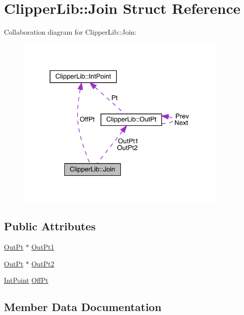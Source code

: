 \hypertarget{struct_clipper_lib_1_1_join}{}\section{Clipper\+Lib\+::Join Struct Reference}
\label{struct_clipper_lib_1_1_join}


Collaboration diagram for Clipper\+Lib\+::Join\+:
\nopagebreak
\begin{figure}[H]
\begin{center}
\leavevmode
\includegraphics[width=291pt]{struct_clipper_lib_1_1_join__coll__graph}
\end{center}
\end{figure}
\subsection*{Public Attributes}
\begin{DoxyCompactItemize}
\item 
\mbox{\hyperlink{struct_clipper_lib_1_1_out_pt}{Out\+Pt}} $\ast$ \mbox{\hyperlink{struct_clipper_lib_1_1_join_a83d7ff096b1cf9425f1c814b7ee5a55d}{Out\+Pt1}}
\item 
\mbox{\hyperlink{struct_clipper_lib_1_1_out_pt}{Out\+Pt}} $\ast$ \mbox{\hyperlink{struct_clipper_lib_1_1_join_a589b2e1162679def2ccd3889306a9230}{Out\+Pt2}}
\item 
\mbox{\hyperlink{struct_clipper_lib_1_1_int_point}{Int\+Point}} \mbox{\hyperlink{struct_clipper_lib_1_1_join_afa70561700d774cd762d125f9866327f}{Off\+Pt}}
\end{DoxyCompactItemize}


\subsection{Member Data Documentation}
\mbox{\label{struct_clipper_lib_1_1_join_afa70561700d774cd762d125f9866327f}} 
